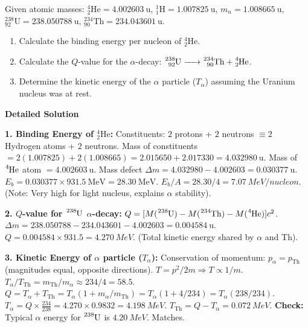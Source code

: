 \documentclass[11pt]{article}
\begin{document}
\begin{exoresolu}
Given atomic masses: $\ensuremath{\mathrm{^{4}_{2}He}} = 4.002603\ \text{u}$, $\ensuremath{\mathrm{^{1}_{1}H}} = 1.007825\ \text{u}$, $m_n = 1.008665\ \text{u}$, $\ensuremath{\mathrm{^{238}_{92}U}} = 238.050788\ \text{u}$, $\ensuremath{\mathrm{^{234}_{90}Th}} = 234.043601\ \text{u}$.
\begin{enumerate}
\item Calculate the binding energy per nucleon of $\ensuremath{\mathrm{^{4}_{2}He}}$.
\item Calculate the $Q$-value for the $\alpha$-decay: $\ce{^{238}_{92}U -> ^{234}_{90}Th + ^{4}_{2}He}$.
\item Determine the kinetic energy of the $\alpha$ particle ($T_\alpha$) assuming the Uranium nucleus was at rest.
\end{enumerate}
\tcblower
\textbf{Detailed Solution}

\textbf{1. Binding Energy of $\ensuremath{\mathrm{^{4}_{2}He}}$:}
Constituents: $2$ protons + $2$ neutrons $\equiv 2$ Hydrogen atoms + $2$ neutrons.
Mass of constituents $= 2(1.007825) + 2(1.008665) = 2.015650 + 2.017330 = 4.032980\ \text{u}$.
Mass of $\ce{^{4}He}$ atom $= 4.002603\ \text{u}$.
Mass defect $\Delta m = 4.032980 - 4.002603 = 0.030377\ \text{u}$.
$E_b = 0.030377 \times 931.5\ \text{MeV} = 28.30\ \text{MeV}$.
$E_b/A = 28.30 / 4 = \SI{7.07}{MeV/nucleon}$.
(Note: Very high for light nucleus, explains $\alpha$ stability).

\textbf{2. $Q$-value for $\ce{^{238}U}$ $\alpha$-decay:}
$Q = [M(\ce{^{238}U}) - M(\ce{^{234}Th}) - M(\ce{^{4}He})] c^2$.
$\Delta m = 238.050788 - 234.043601 - 4.002603 = 0.004584\ \text{u}$.
$Q = 0.004584 \times 931.5 = \SI{4.270}{MeV}$.
(Total kinetic energy shared by $\alpha$ and Th).

\textbf{3. Kinetic Energy of $\alpha$ particle ($T_\alpha$):}
Conservation of momentum: $p_\alpha = p_{\text{Th}}$ (magnitudes equal, opposite directions).
$T = p^2 / 2m \Rightarrow T \propto 1/m$.
$T_\alpha / T_{\text{Th}} = m_{\text{Th}} / m_\alpha \approx 234 / 4 = 58.5$.
$Q = T_\alpha + T_{\text{Th}} = T_\alpha (1 + m_\alpha/m_{\text{Th}}) = T_\alpha (1 + 4/234) = T_\alpha (238/234)$.
$T_\alpha = Q \times \frac{234}{238} = 4.270 \times 0.9832 = \SI{4.198}{MeV}$.
$T_{\text{Th}} = Q - T_\alpha = \SI{0.072}{MeV}$.
\textbf{Check:} Typical $\alpha$ energy for $\ce{^{238}U}$ is $\SI{4.20}{MeV}$. Matches.
\end{exoresolu}
\end{document}

